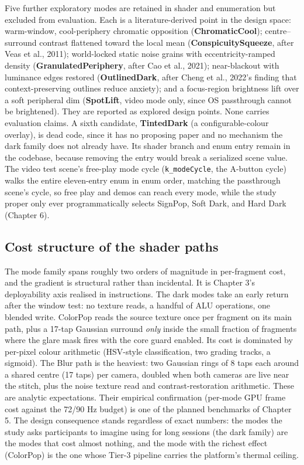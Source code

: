 Five further exploratory modes are retained in shader and enumeration but excluded from evaluation.
Each is a literature-derived point in the design space: warm-window, cool-periphery chromatic
opposition (\textbf{ChromaticCool}); centre–surround contrast flattened toward the local mean
(\textbf{ConspicuitySqueeze}, after Veas et al., 2011); world-locked static noise grains with
eccentricity-ramped density (\textbf{GranulatedPeriphery}, after Cao et al., 2021); near-blackout with
luminance edges restored (\textbf{OutlinedDark}, after Cheng et al., 2022's finding that
context-preserving outlines reduce anxiety); and a focus-region brightness lift over a soft
peripheral dim (\textbf{SpotLift}, video mode only, since OS passthrough cannot be brightened). They
are reported as explored design points. None carries evaluation claims. A sixth candidate,
\textbf{TintedDark} (a configurable-colour overlay), is dead code, since it has no proposing paper and
no mechanism the dark family does not already have. Its shader branch and enum entry remain in the
codebase, because removing the entry would break a serialized scene value. The video test scene's
free-play mode cycle (\verb|k_modeCycle|, the A-button cycle) walks the entire eleven-entry enum in
enum order, matching the passthrough scene's cycle, so free play and demos can reach every mode,
while the study proper only ever programmatically selects SignPop, Soft Dark, and Hard Dark
(Chapter 6).

\subsection{Cost structure of the shader paths}

The mode family spans roughly two orders of magnitude in per-fragment cost, and the gradient is
structural rather than incidental. It is Chapter 3's deployability axis realised in instructions. The
dark modes take an early return after the window test: no texture reads, a handful of ALU
operations, one blended write. ColorPop reads the source texture once per fragment on its main path,
plus a 17-tap Gaussian surround \textit{only} inside the small fraction of fragments where the glare mask
fires with the core guard enabled. Its cost is dominated by per-pixel colour arithmetic (HSV-style
classification, two grading tracks, a sigmoid). The Blur path is the heaviest: two Gaussian rings of
8 taps each around a shared centre (17 taps) per camera, doubled when both cameras are live near the
stitch, plus the noise texture read and contrast-restoration arithmetic. These are analytic
expectations. Their empirical confirmation (per-mode GPU frame cost against the 72/90 Hz budget) is
one of the planned benchmarks of Chapter 5. The design consequence stands regardless of exact
numbers: the modes the study asks participants to imagine using for long sessions (the dark family)
are the modes that cost almost nothing, and the mode with the richest effect (ColorPop) is the one
whose Tier-3 pipeline carries the platform's thermal ceiling.


